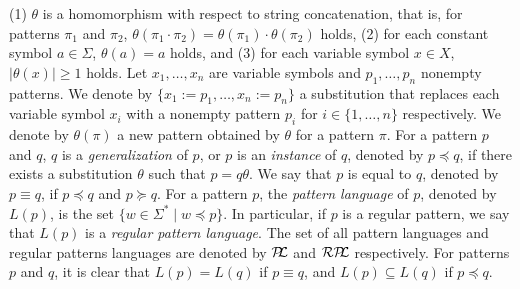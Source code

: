 (1) $\theta$ is a homomorphism with respect to string concatenation, that is, for patterns $\pi_{1}$ and $\pi_{2}$,
$\theta(\pi_{1} \cdot \pi_{2}) = \theta(\pi_{1}) \cdot \theta(\pi_{2})$ holds,
(2) for each constant symbol $a \in \Sigma$, $\theta(a) = a$ holds,
and (3) for each variable symbol $x \in X$, $|\theta(x)| \geq 1$ holds.
Let $x_{1},\ldots,x_{n}$ are variable symbols and $p_{1},\ldots,p_{n}$ nonempty patterns.
We denote by $\{x_{1}:=p_{1},\ldots,x_{n}:=p_{n}\}$ a substitution that replaces each variable symbol $x_{i}$
with a nonempty pattern $p_{i}$ for $i \in \{1,\ldots,n\}$ respectively.
We denote by $\theta(\pi)$ a new pattern obtained by $\theta$ for a pattern $\pi$.
%
For a pattern $p$ and $q$,
$q$ is a \textit{generalization} of $p$, or $p$ is an \textit{instance} of $q$, denoted by $p \preceq q$,
if there exists a substitution $\theta$ such that $p = q\theta$.
We say that $p$ is equal to $q$, denoted by $p \equiv q$, if $p \preceq q$ and $p \succeq q$.
%
%
For a pattern $p$, the \textit{pattern language} of $p$, denoted by $L(p)$, is the set $\{w \in \Sigma^{\ast} \mid w \preceq p\}$.
In particular, if $p$ is a regular pattern, we say that $L(p)$ is a \textit{regular pattern language}.
The set of all pattern languages and regular patterns languages are denoted by $\mathcal{P\!\!L}$ and $\mathcal{RP\!\!L}$ respectively.
For patterns $p$ and $q$, it is clear that $L(p) = L(q)$ if $p \equiv q$, and $L(p) \subseteq L(q)$ if $p \preceq q$.
